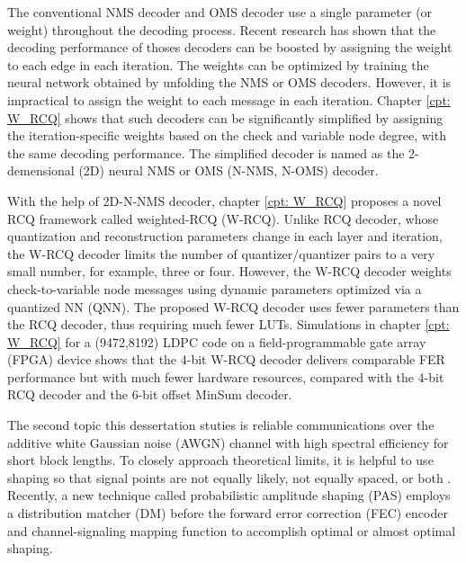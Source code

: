\documentclass [PhD] {uclathes}
\begin{document}
The conventional NMS decoder and OMS decoder use a single parameter (or weight) throughout the decoding process. Recent research has shown that the decoding performance of thoses decoders can be boosted by assigning the weight to each edge in each iteration\cite{nachimain_ldpc_neural_decoder}. The weights can be optimized by training the neural network obtained by unfolding the NMS or OMS decoders. However, it is impractical to assign the weight to each message in each iteration. Chapter \ref{cpt: W_RCQ} shows that such decoders can be significantly simplified by assigning the iteration-specific weights based on the check and variable node degree, with the same decoding performance. The simplified decoder is named as the 2-demensional (2D) neural NMS or OMS (N-NMS, N-OMS) decoder.

With the help of 2D-N-NMS decoder, chapter \ref{cpt: W_RCQ} proposes a novel RCQ framework called weighted-RCQ (W-RCQ). Unlike RCQ decoder, whose quantization and reconstruction parameters  change in each layer and iteration, the W-RCQ decoder limits the number of quantizer/quantizer pairs to a very small number, for example, three or four. However, the W-RCQ decoder weights check-to-variable node messages using dynamic parameters optimized via a quantized NN (QNN). The proposed W-RCQ decoder uses fewer parameters than the RCQ decoder, thus requiring much fewer LUTs.  Simulations in chapter \ref{cpt: W_RCQ} for a (9472,8192) LDPC code on a field-programmable gate array (FPGA) device shows that the 4-bit W-RCQ decoder delivers comparable FER performance but with much fewer hardware resources, compared with the 4-bit RCQ decoder and the 6-bit offset MinSum decoder.


The second topic this dessertation stuties is reliable communications over the additive white Gaussian noise (AWGN) channel with high spectral efficiency for short block lengths.  To closely approach theoretical limits, it is helpful to use shaping so that signal points are not equally likely, not equally spaced, or both \cite{gallager1968information,ForneyShaping,forney1992trellis,Kschischangoptimaldist,laroia1994optimal,fragouli2001,xiao2021finite}.  Recently, a new technique called  probabilistic amplitude shaping (PAS) \cite{pas_bocherer_1,pas_bocherer_2} employs a distribution matcher (DM) \cite{CCDM_schulte} before the forward error correction (FEC) encoder and channel-signaling mapping function to accomplish optimal or almost optimal shaping. 
\end{document}
